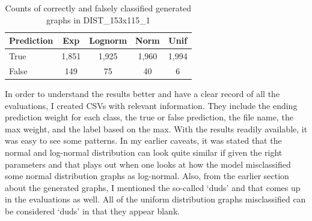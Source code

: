 \documentclass[12pt]{article}
\begin{document}
            \begin{table}

                \begin{center}

                    \begin{tabular}{| l | c | c | c | c |}

                        \hline
                        \textbf{Prediction}   &    \textbf{Exp}   &   \textbf{Lognorm}   &    \textbf{Norm}    &    \textbf{Unif} \\
                        \hline
                        True                  & 1,851             & 1,925                & 1,960               & 1,994 \\
                        False                 & 149               & 75                   & 40                  & 6 \\

                        \hline

                    \end{tabular}

                    \caption{Counts of correctly and falsely classified generated graphs in DIST\_153x115\_1}
                    \label{counts-all-gen-dist}

                \end{center}

            \end{table}
            
            In order to understand the results better and have a clear record of all the evaluations, 
            I created CSVs with relevant information. They include the ending prediction weight for each class, 
            the true or false prediction, the file name, the max weight, and the label based on the max.
            With the results readily available, it was easy to see some patterns. 
            In my earlier caveats, it was stated that the normal and log-normal distribution can look quite similar 
            if given the right parameters and that plays out when one looks at 
            how the model misclassified some normal distribution graphs as log-normal. 
            Also, from the earlier section about the generated graphs, 
            I mentioned the so-called ‘duds’ and that comes up in the evaluations as well. 
            All of the uniform distribution graphs misclassified can be considered ‘duds’ in that they appear blank.
\end{document}
